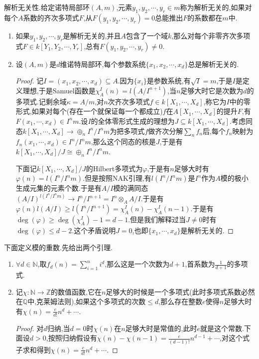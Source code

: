 解析无关性.给定诺特局部环$(A,m)$,元素$y_1,y_2,\cdots,y_r\in m$称为解析无关的,如果对每个$A$系数的齐次多项式$F$,从$F(y_1,y_2,\cdots,y_r)=0$总能推出$F$的系数都在$m$中.
\begin{enumerate}
	\item 如果$y_1,y_2,\cdots,y_r$是解析无关的,并且$A$包含了一个域$k$,那么对每个非零齐次多项式$F\in k[Y_1,Y_2,\cdots,Y_r]$,总有$F(y_1,y_2,\cdots,y_r)\not=0$.
	\item 设$(A,m)$是$d$维诺特局部环,每个参数系统$\{x_1,x_2,\cdots,x_d\}$总是解析无关的.
	\begin{proof}
		
		记$I=(x_1,x_2,\cdots,x_d)\subseteq A$.因为$\{x_i\}$是参数系统,有$\sqrt{I}=m$,于是$I$是定义理想,于是Samuel函数是$\chi_A^I(n)=l(A/I^{n+1})$,当$n$足够大时它是次数为$d$的多项式.记剩余域$\kappa=A/m$,对$n$次齐次多项式$f\in k[X_1,\cdots,X_d]$,称它为$I$中的零形式,如果对每个(存在一个就保证每一个都成立)$f$在$A[X_1,\cdots,X_d]$的提升$F$,有$F(x_1,\cdots,x_d)\in I^nm$.设$I$的全体零形式生成的理想为$J\subseteq k[X_1,\cdots,X_d]$.考虑同态$k[X_1,\cdots,X_d]\to\oplus_nI^n/I^nm$为把多项式$f$做齐次分解$\sum_nf_n$后,每个$f_n$映射为$f_n(x_1,\cdots,x_d)\in I^n/I^nm$,那么这个同态的核是$J$,于是有$k[X_1,\cdots,X_d]/J\cong\oplus_nI^n/I^nm$.
		
		\qquad
		
		下面记$k[X_1,\cdots,X_d]/J$的Hilbert多项式为$\varphi$,于是有$n$足够大时有$\varphi(n)=l(I^n/I^nm)$.但是按照NAK引理,有$l(I^n/I^nm)$是$I^n$作为$A$模的极小生成元集的元素个数.于是有$A/I$模的满同态$(A/I)^{l(I^n/I^nm)}\to I^n/I^{n+1}=I^n\otimes_AA/I$.于是有$\varphi(n)l(A/I)\ge l(I^n/I^{n+1})=\chi_A^I(n)-\chi_A^I(n-1)$.于是有$\deg(\varphi)\ge\deg(\chi_A^I)-1=d-1$.但是我们解释过当$J\not=0$时有$\deg(\varphi)\le d-2$.这个矛盾说明$J=0$,也即$\{x_1,\cdots,x_d\}$是解析无关的.
	\end{proof}
\end{enumerate}

下面定义模的重数.先给出两个引理.
\begin{enumerate}
	\item $\forall d\in\mathbb{N}$,取$f_d(n)=\sum_{i=1}^ni^d$,那么这是一个次数为$d+1$,首系数为$\frac{1}{d+1}$的多项式.
	\item 记$\chi:\mathbb{N}\to\mathbb{Z}$的数值函数,它在$n$足够大的时候是一个多项式(此时多项式系数必然在$\mathbb{Q}$中,克莱姆法则),如果这个多项式的次数$\le d$,那么存在整数$e$使得$n$足够大时有$\chi(n)=\frac{e}{d!}n^d+\cdots$.
	\begin{proof}
		
		对$d$归纳,当$d=0$时$\chi(n)$在$n$足够大时是常值的,此时$e$就是这个常数.下面设$d>0$,按照归纳假设有$\chi(n)-\chi(n-1)=\frac{e}{(d-1)!}n^{d-1}+\cdots$,对这个式子求和得到$\chi(n)=\frac{e}{d!}n^d+\cdots$.
	\end{proof}
\end{enumerate}

